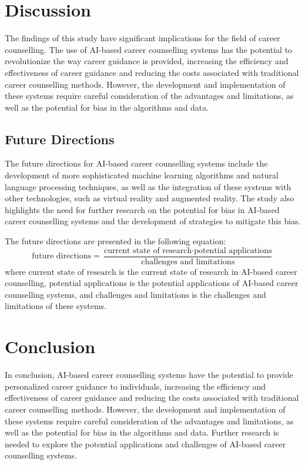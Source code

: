 \documentclass[12pt,a4paper]{article}
\begin{document}
\section{Discussion}
The findings of this study have significant implications for the field of career counselling. The use of AI-based career counselling systems has the potential to revolutionize the way career guidance is provided, increasing the efficiency and effectiveness of career guidance and reducing the costs associated with traditional career counselling methods. However, the development and implementation of these systems require careful consideration of the advantages and limitations, as well as the potential for bias in the algorithms and data.

\subsection{Future Directions}
The future directions for AI-based career counselling systems include the development of more sophisticated machine learning algorithms and natural language processing techniques, as well as the integration of these systems with other technologies, such as virtual reality and augmented reality. The study also highlights the need for further research on the potential for bias in AI-based career counselling systems and the development of strategies to mitigate this bias.

The future directions are presented in the following equation:
\[ \text{future directions} = \frac{\text{current state of research} \cdot \text{potential applications}}{\text{challenges and limitations}} \]
where $\text{current state of research}$ is the current state of research in AI-based career counselling, $\text{potential applications}$ is the potential applications of AI-based career counselling systems, and $\text{challenges and limitations}$ is the challenges and limitations of these systems.

\section{Conclusion}
In conclusion, AI-based career counselling systems have the potential to provide personalized career guidance to individuals, increasing the efficiency and effectiveness of career guidance and reducing the costs associated with traditional career counselling methods. However, the development and implementation of these systems require careful consideration of the advantages and limitations, as well as the potential for bias in the algorithms and data. Further research is needed to explore the potential applications and challenges of AI-based career counselling systems.
\end{document}
